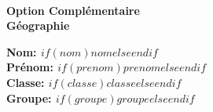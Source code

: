 ~
\vspace{3.5cm}
\begin{center}
	\bfseries\Huge Option Complémentaire\\ Géographie
	\vspace{3cm}
\end{center}
\vspace{7cm}

\renewcommand\ULthickness{1pt}\setlength\ULdepth{.5ex}\Large\bfseries
Nom:\tabto{3cm}    $if(nom)$$nom$$else$\uline{\hfill}$endif$\\[.5cm]
Prénom:\tabto{3cm} $if(prenom)$$prenom$$else$\uline{\hfill}$endif$\\[.5cm]
Classe:\tabto{3cm} $if(classe)$$classe$$else$\uline{\hfill}$endif$\\[.5cm]
Groupe:\tabto{3cm} $if(groupe)$$groupe$$else$\uline{\hfill}$endif$\\[.5cm]

\renewcommand\ULthickness{.5pt}\setlength\ULdepth{.3ex}\normalfont

\clearpage
{}
\pagestyle{foot}